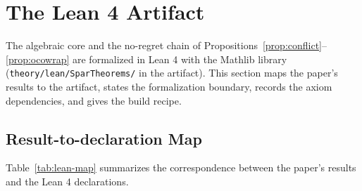 \section{The Lean 4 Artifact}
\label{app:lean}


The algebraic core and the no-regret chain of Propositions~\ref{prop:conflict}--\ref{prop:ocowrap} are formalized in Lean 4 \citep{demoura2021} with the Mathlib library \citep{mathlib2020} (\texttt{theory/lean/SparTheorems/} in the artifact).
This section maps the paper's results to the artifact, states the formalization boundary, records the axiom dependencies, and gives the build recipe.

\subsection{Result-to-declaration Map}
Table~\ref{tab:lean-map} summarizes the correspondence between the paper's results and the Lean 4 declarations.

